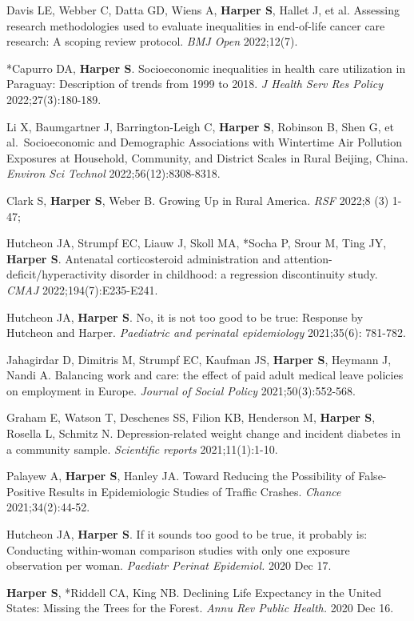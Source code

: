 \documentclass[
  letterpaper,
  DIV=11,
  numbers=noendperiod]{scrartcl}
\begin{document}
Davis LE, Webber C, Datta GD, Wiens A, \textbf{Harper S}, Hallet J, et
al. Assessing research methodologies used to evaluate inequalities in
end-of-life cancer care research: A scoping review protocol. \emph{BMJ
Open} 2022;12(7).

*Capurro DA, \textbf{Harper S}. Socioeconomic inequalities in health
care utilization in Paraguay: Description of trends from 1999 to 2018.
\emph{J Health Serv Res Policy} 2022;27(3):180-189.

Li X, Baumgartner J, Barrington-Leigh C, \textbf{Harper S}, Robinson B,
Shen G, et al.~Socioeconomic and Demographic Associations with
Wintertime Air Pollution Exposures at Household, Community, and District
Scales in Rural Beijing, China. \emph{Environ Sci Technol}
2022;56(12):8308-8318.

Clark S, \textbf{Harper S}, Weber B. Growing Up in Rural America.
\emph{RSF} 2022;8 (3) 1-47;

Hutcheon JA, Strumpf EC, Liauw J, Skoll MA, *Socha P, Srour M, Ting JY,
\textbf{Harper S}. Antenatal corticosteroid administration and
attention-deficit/hyperactivity disorder in childhood: a regression
discontinuity study. \emph{CMAJ} 2022;194(7):E235-E241.

Hutcheon JA, \textbf{Harper S}. No, it is not too good to be true:
Response by Hutcheon and Harper. \emph{Paediatric and perinatal
epidemiology} 2021;35(6): 781-782.

Jahagirdar D, Dimitris M, Strumpf EC, Kaufman JS, \textbf{Harper S},
Heymann J, Nandi A. Balancing work and care: the effect of paid adult
medical leave policies on employment in Europe. \emph{Journal of Social
Policy} 2021;50(3):552-568.

Graham E, Watson T, Deschenes SS, Filion KB, Henderson M, \textbf{Harper
S}, Rosella L, Schmitz N. Depression-related weight change and incident
diabetes in a community sample. \emph{Scientific reports}
2021;11(1):1-10.

Palayew A, \textbf{Harper S}, Hanley JA. Toward Reducing the Possibility
of False-Positive Results in Epidemiologic Studies of Traffic Crashes.
\emph{Chance} 2021;34(2):44-52.

Hutcheon JA, \textbf{Harper S}. If it sounds too good to be true, it
probably is: Conducting within-woman comparison studies with only one
exposure observation per woman. \emph{Paediatr Perinat Epidemiol.} 2020
Dec 17.

\textbf{Harper S}, *Riddell CA, King NB. Declining Life Expectancy in
the United States: Missing the Trees for the Forest. \emph{Annu Rev
Public Health.} 2020 Dec 16.
\end{document}
